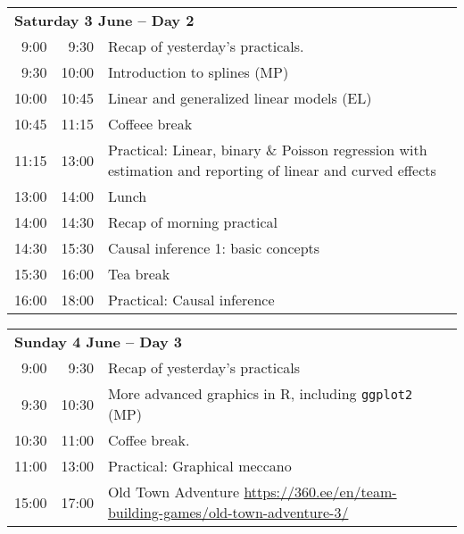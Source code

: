 \noindent
\begin{tabular}{r@{ -- }rp{13cm}}
\multicolumn{3}{l}{\bf Saturday 3 June -- Day 2} \\
 9:00 &  9:30 & Recap of yesterday's practicals. \\
 9:30 & 10:00 & Introduction to splines (MP)\\ %
10:00 & 10:45 & Linear and generalized linear models (EL)\\ %
10:45 & 11:15 & Coffeee break \\
11:15 & 13:00 & Practical: Linear, binary \& Poisson regression  
                with estimation and reporting of linear and curved
                effects\\ %
13:00 & 14:00 & Lunch \\
14:00 & 14:30 & Recap of morning practical \\
14:30 & 15:30 & Causal inference 1: basic concepts\\ %
15:30 & 16:00 & Tea break\\
16:00 & 18:00 & Practical: Causal inference\\[1em] %
\end{tabular}

\noindent
\begin{tabular}{r@{ -- }rp{13cm}}
 \multicolumn{3}{l}{\bf Sunday 4 June -- Day 3} \\
 9:00 &  9:30 & Recap of yesterday's practicals \\
 9:30 & 10:30 & More advanced graphics in R, including
                \texttt{ggplot2} (MP)\\ %
10:30 & 11:00 & Coffee break. \\
11:00 & 13:00 & Practical: Graphical meccano \\%
15:00 & 17:00 & Old Town Adventure \newline \url{https://360.ee/en/team-building-games/old-town-adventure-3/}\\[1em]
\end{tabular}

